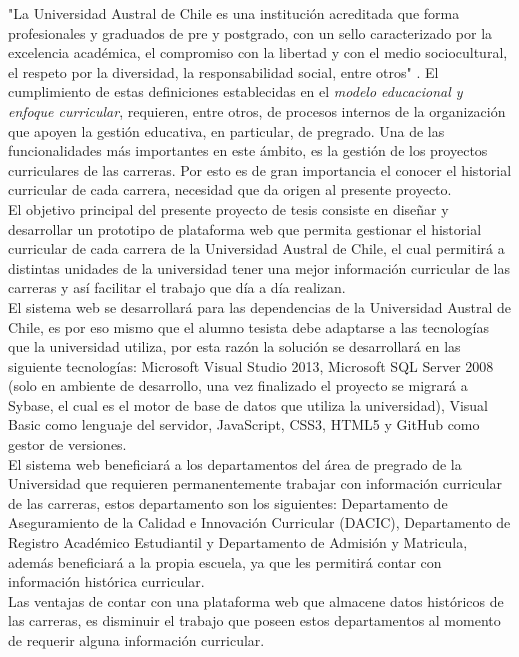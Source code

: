 
			"La Universidad Austral de Chile es una institución acreditada que forma profesionales y graduados de pre 
			y postgrado, con un sello caracterizado por la excelencia académica, el compromiso con la libertad y con 
			el medio sociocultural, el respeto por la diversidad, la responsabilidad social, entre otros" \cite{MOD07}. 
			El cumplimiento de estas definiciones establecidas en el \textit{ modelo educacional y enfoque curricular}, requieren, entre otros, de procesos internos de la organización que apoyen la gestión educativa, en particular, de pregrado. Una de las funcionalidades más importantes en este ámbito, es la gestión de los proyectos curriculares de las carreras. Por esto es de gran importancia el conocer el historial curricular de cada carrera, necesidad que da origen al presente proyecto.
			\\
			
			El objetivo principal del presente proyecto de tesis consiste en diseñar y desarrollar un prototipo de 
			plataforma web que permita gestionar el historial curricular de cada carrera de la Universidad Austral 
			de Chile, el cual permitirá a distintas unidades de la universidad tener una mejor información curricular 
			de las carreras y así facilitar el trabajo que día a día realizan.
			\\

			
			El sistema web se desarrollará para las dependencias de la Universidad Austral de Chile, es por eso mismo que
			el alumno tesista debe adaptarse a las tecnologías que la universidad utiliza, por esta razón la solución se 
			desarrollará en las siguiente tecnologías: Microsoft Visual Studio 2013, Microsoft SQL Server 2008 
			(solo en ambiente de desarrollo, una vez finalizado el proyecto se migrará a Sybase, el cual es el motor 
			de base de datos que utiliza la universidad), Visual Basic como lenguaje del servidor, JavaScript, CSS3, HTML5 
			y GitHub como gestor de versiones.
			\\

			
			El sistema web beneficiará a los departamentos del área de pregrado de la Universidad que requieren permanentemente trabajar con información curricular de las carreras, estos departamento son los siguientes: 
			Departamento de Aseguramiento de la Calidad e Innovación Curricular (DACIC), Departamento de Registro 
			Académico Estudiantil y  Departamento de Admisión y Matricula, además beneficiará a la propia escuela, ya que les permitirá contar con
			información histórica curricular.
			\\
			
			Las ventajas de contar con una plataforma web que almacene datos históricos de las carreras, es disminuir el 
			trabajo que poseen estos departamentos al momento de requerir alguna información curricular.

			